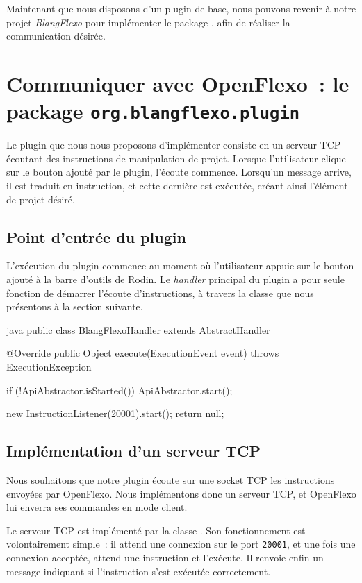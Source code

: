 Maintenant que nous disposons d'un plugin de base, nous pouvons revenir à notre projet \textit{BlangFlexo} pour implémenter le package , afin %
de réaliser la communication désirée.


\section{Communiquer avec OpenFlexo~: le package \texttt{org.blangflexo.plugin}}

Le plugin que nous nous proposons d'implémenter consiste en un serveur TCP écoutant des instructions de manipulation de projet.
Lorsque l'utilisateur clique sur le bouton ajouté par le plugin, l'écoute commence.
Lorsqu'un message arrive, il est traduit en instruction, et cette dernière est exécutée, créant ainsi l'élément de projet désiré.

\subsection{Point d'entrée du plugin}

L'exécution du plugin commence au moment où l'utilisateur appuie sur le bouton ajouté à la barre d'outils de Rodin.
Le \textit{handler} principal du plugin a pour seule fonction de démarrer l'écoute d'instructions, à travers la classe  que nous présentons à la section suivante.

\begin{imtaCode}{java}
public class BlangFlexoHandler extends AbstractHandler {
    
    
    @Override
    public Object execute(ExecutionEvent event) throws ExecutionException {
        if (!ApiAbstractor.isStarted())
        	ApiAbstractor.start();
        
        new InstructionListener(20001).start();
        return null;
    }
}
\end{imtaCode}

\subsection{Implémentation d'un serveur TCP}

Nous souhaitons que notre plugin écoute sur une socket TCP les instructions envoyées par OpenFlexo.
Nous implémentons donc un serveur TCP, et OpenFlexo lui enverra ses commandes en mode client.

Le serveur TCP est implémenté par la classe .
Son fonctionnement est volontairement simple~: il attend une connexion sur le port \texttt{20001}, et une fois une connexion acceptée, attend une instruction et l'exécute.
Il renvoie enfin un message indiquant si l'instruction s'est exécutée correctement.


